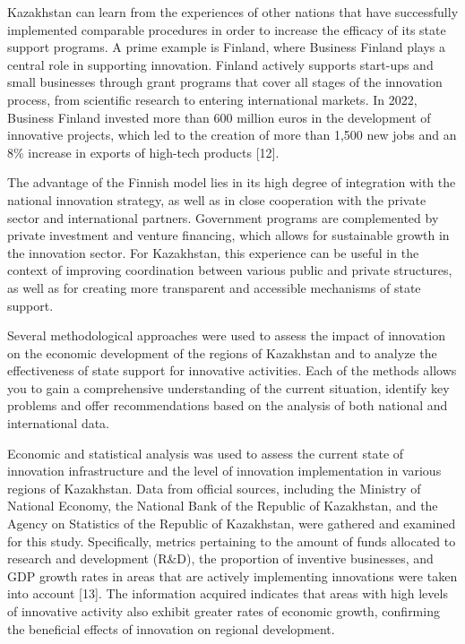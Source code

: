 \begin{multicols}{2}
Kazakhstan can learn from the experiences of other nations that have
successfully implemented comparable procedures in order to increase the
efficacy of its state support programs. A prime example is Finland,
where Business Finland plays a central role in supporting innovation.
Finland actively supports start-ups and small businesses through grant
programs that cover all stages of the innovation process, from
scientific research to entering international markets. In 2022, Business
Finland invested more than 600 million euros in the development of
innovative projects, which led to the creation of more than 1,500 new
jobs and an 8\% increase in exports of high-tech products {[}12{]}.

The advantage of the Finnish model lies in its high degree of
integration with the national innovation strategy, as well as in close
cooperation with the private sector and international partners.
Government programs are complemented by private investment and venture
financing, which allows for sustainable growth in the innovation sector.
For Kazakhstan, this experience can be useful in the context of
improving coordination between various public and private structures, as
well as for creating more transparent and accessible mechanisms of state
support.

Several methodological approaches were used to assess the impact of
innovation on the economic development of the regions of Kazakhstan and
to analyze the effectiveness of state support for innovative activities.
Each of the methods allows you to gain a comprehensive understanding of
the current situation, identify key problems and offer recommendations
based on the analysis of both national and international data.

Economic and statistical analysis was used to assess the current state
of innovation infrastructure and the level of innovation implementation
in various regions of Kazakhstan. Data from official sources, including
the Ministry of National Economy, the National Bank of the Republic of
Kazakhstan, and the Agency on Statistics of the Republic of Kazakhstan,
were gathered and examined for this study. Specifically, metrics
pertaining to the amount of funds allocated to research and development
(R\&D), the proportion of inventive businesses, and GDP growth rates in
areas that are actively implementing innovations were taken into account
{[}13{]}. The information acquired indicates that areas with high levels
of innovative activity also exhibit greater rates of economic growth,
confirming the beneficial effects of innovation on regional development.


\end{multicols}
